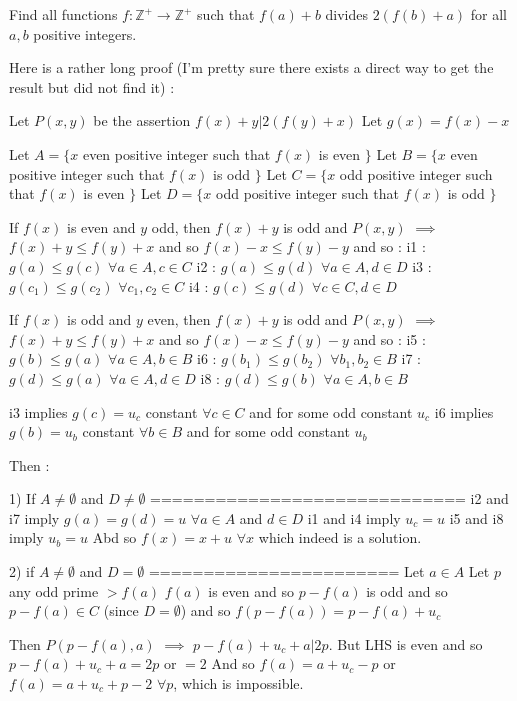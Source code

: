 \begin{solution}
	\begin{tcolorbox}Find all functions $f:\mathbb{Z^+}\rightarrow\mathbb{Z^+}$ such that $f(a)+b$ divides $2(f(b)+a)$ for all $a,b$ positive integers.\end{tcolorbox}
Here is a rather long proof (I'm pretty sure there exists a direct way to get the result but did not find it) :

Let $P(x,y)$ be the assertion $f(x)+y|2(f(y)+x)$
Let $g(x)=f(x)-x$

Let $A=\{x$ even positive integer such that $f(x)$ is even $\}$
Let $B=\{x$ even positive integer such that $f(x)$ is odd $\}$
Let $C=\{x$ odd positive integer such that $f(x)$ is even $\}$
Let $D=\{x$ odd positive integer such that $f(x)$ is odd $\}$

If $f(x)$ is even and $y$ odd, then $f(x)+y$ is odd and $P(x,y)$ $\implies$ $f(x)+y\le f(y)+x$ and so $f(x)-x\le f(y)-y$ and so :
i1 : $g(a)\le g(c)$ $\forall a\in A,c\in C$
i2 : $g(a)\le g(d)$ $\forall a\in A,d\in D$
i3 : $g(c_1)\le g(c_2)$ $\forall c_1,c_2\in C$
i4 : $g(c)\le g(d)$ $\forall c\in C,d\in D$

If $f(x)$ is odd and $y$ even, then $f(x)+y$ is odd and $P(x,y)$ $\implies$ $f(x)+y\le f(y)+x$ and so $f(x)-x\le f(y)-y$ and so :
i5 : $g(b)\le g(a)$ $\forall a\in A, b\in B$
i6 : $g(b_1)\le g(b_2)$ $\forall b_1,b_2\in B$
i7 : $g(d)\le g(a)$ $\forall a\in A,d\in D$
i8 : $g(d)\le g(b)$ $\forall a\in A,b\in B$

i3 implies $g(c)=u_c$ constant $\forall c\in C$ and for some odd constant $u_c$
i6 implies $g(b)=u_b$ constant $\forall b\in B$ and for some odd constant $u_b$

Then :

1) If $A\ne \emptyset$ and $D\ne \emptyset$
=============================
i2 and i7 imply $g(a)=g(d)=u$ $\forall a\in A$ and $d\in D$
i1 and i4 imply $u_c=u$
i5 and i8 imply $u_b=u$
Abd so $f(x)=x+u$ $\forall x$ which indeed is a solution.

2) if $A\ne \emptyset$ and $D=\emptyset$
=======================
Let $a\in A$
Let $p$ any odd prime $>f(a)$
$f(a)$ is even and so $p-f(a)$ is odd and so $p-f(a)\in C$ (since $D=\emptyset$) and so $f(p-f(a))=p-f(a)+u_c$

Then $P(p-f(a),a)$ $\implies$ $p-f(a)+u_c+a|2p$. But LHS is even and so $p-f(a)+u_c+a=2p$ or $=2$
And so $f(a)=a+u_c-p$ or $f(a)=a+u_c+p-2$ $\forall p$,  which is impossible.


\end{solution}
